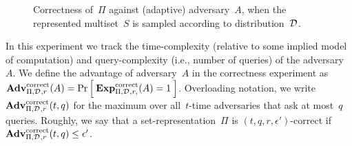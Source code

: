 \begin{figure}[htp]
\centering
{}
\caption{Correctness of~$\Pi$ against (adaptive) adversary~$A$, when
  the represented multiset~$S$ is sampled according to distribution~$\mathcal{D}_{}^{}$.} 
\label{fig:correctness}
\end{figure}

In this experiment we track the time-complexity (relative to some
implied model of computation) and query-complexity (i.e., number of
queries) of the adversary~$A$.  
We define the advantage of adversary~$A$ in the correctness experiment as 
$\mathrm{\mathbf{Adv}}^{\mathrm{correct}}_{\Pi,\mathcal{D}_{}^{},r}(A) = \Pr\left[\: \mathrm{\mathbf{Exp}}^{\mathrm{correct}}_{\Pi,\mathcal{D}_{}^{}, r,}(A)=1 \:\right]$.
Overloading notation, we write $\mathrm{\mathbf{Adv}}^{\mathrm{correct}}_{\Pi,\mathcal{D}_{}^{},r}(t,q)$ for the maximum over all~$t$-time adversaries that ask at most~$q$ queries. Roughly, we say that a
set-representation~$\Pi$ is $(t,q,r,\epsilon')$-correct if $\mathrm{\mathbf{Adv}}^{\mathrm{correct}}_{\Pi,\mathcal{D}_{}^{},r}(t,q) \leq \epsilon'$.  


